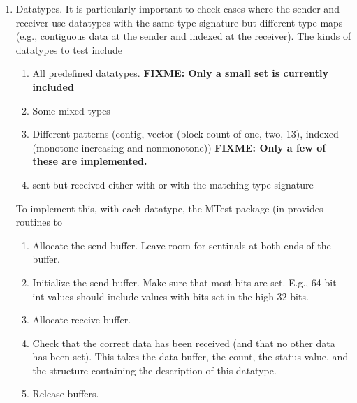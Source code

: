 \documentclass{article}
\def\fixme#1{\marginpar{FIXME:}\textbf{FIXME: #1}}
\begin{document}
\begin{enumerate}

\item Datatypes. It is particularly important to check cases where the
sender and receiver use datatypes with the same type signature but 
different type maps (e.g., contiguous data at the sender and indexed
at the receiver).  The kinds of datatypes to test include

     \begin{enumerate}
     \item All predefined datatypes. \fixme{Only a small set is
     currently included}
     \item Some mixed types
     \item Different patterns (contig, vector (block count of one,
           two, 13), indexed (monotone
           increasing and nonmonotone)) \fixme{Only a few of these
             are implemented.}
     \item {} sent but received either with
            or with the matching type signature
     \end{enumerate}
     To implement this, with each datatype, the MTest package (in
      provides routines to
     \begin{enumerate}
     \item Allocate the send buffer.  Leave room for sentinals at both
     ends of the buffer.
     \item Initialize the send buffer.  Make sure that most bits are
           set.  E.g., 64-bit int values should include values with
           bits set in the high 32 bits.
     \item Allocate receive buffer.
     \item Check that the correct data has been received (and that no
           other data has been set).  This takes the data buffer, the
           count, the status value, and the structure containing the
           description of this datatype.
     \item Release buffers.
     \end{enumerate}


\end{enumerate}
\end{document}
